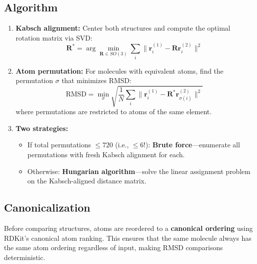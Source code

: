 \documentclass[11pt,a4paper]{article}
\begin{document}
\subsection{Algorithm}

\begin{enumerate}
    \item \textbf{Kabsch alignment:} Center both structures and compute the optimal rotation matrix via SVD:
    \begin{equation}
        \mathbf{R}^* = \arg\min_{\mathbf{R} \in SO(3)} \sum_i \|\mathbf{r}_i^{(1)} - \mathbf{R}\mathbf{r}_i^{(2)}\|^2
    \end{equation}

    \item \textbf{Atom permutation:} For molecules with equivalent atoms, find the permutation $\sigma$ that minimizes RMSD:
    \begin{equation}
        \text{RMSD} = \min_\sigma \sqrt{\frac{1}{N}\sum_i \|\mathbf{r}_i^{(1)} - \mathbf{R}^*\mathbf{r}_{\sigma(i)}^{(2)}\|^2}
    \end{equation}
    where permutations are restricted to atoms of the same element.

    \item \textbf{Two strategies:}
    \begin{itemize}
        \item If total permutations $\leq 720$ (i.e., $\leq 6!$): \textbf{Brute force}---enumerate all permutations with fresh Kabsch alignment for each.
        \item Otherwise: \textbf{Hungarian algorithm}---solve the linear assignment problem on the Kabsch-aligned distance matrix.
    \end{itemize}
\end{enumerate}

\subsection{Canonicalization}

Before comparing structures, atoms are reordered to a \textbf{canonical ordering} using RDKit's canonical atom ranking. This ensures that the same molecule always has the same atom ordering regardless of input, making RMSD comparisons deterministic.
\end{document}
